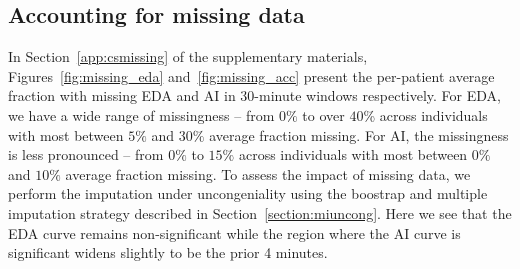 \documentclass[12pt]{amsart}
\begin{document}
\subsection{Accounting for missing data}
\label{sec:missingdata_heterogeneity}


In Section~\ref{app:csmissing} of the supplementary materials, Figures~\ref{fig:missing_eda} and~\ref{fig:missing_acc} present the per-patient average fraction with missing EDA and AI in 30-minute windows respectively. For EDA, we have a wide range of missingness -- from $0\%$ to over $40$\% across individuals with most between $5\%$ and $30\%$ average fraction missing.  For AI, the missingness is less pronounced -- from $0\%$ to $15\%$ across individuals with most between $0\%$ and $10\%$ average fraction missing.  To assess the impact of missing data, we perform the imputation under uncongeniality using the boostrap and multiple imputation strategy described in Section~\ref{section:miuncong}.  Here we see that the EDA curve remains non-significant while the region where the AI curve is significant widens slightly to be the prior 4 minutes.
\end{document}
